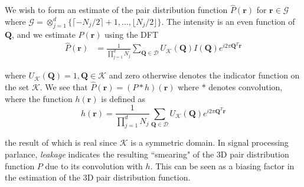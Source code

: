 We wish to form an estimate of the pair distribution function
$\widehat{P}(\mathbf{r})$ for $\mathbf{r} \in \mathcal{G}$ where $\mathcal{G} =
\otimes_{j=1}^d \{\lceil -N_j/2 \rceil + 1, \ldots, \lfloor N_j/2 \rfloor \}$. The
intensity is an even function of $\mathbf{Q}$, and we estimate $P(\mathbf{r})$ using
the DFT
\begin{align}
  \widehat{P}(\mathbf{r}) &= \frac{1}{\prod_{j=1}^d N_j} \sum_{\mathbf{Q}\in
  \mathcal{D}} U_{\mathcal{K}} (\mathbf{Q}) I(\mathbf{Q}) e^{i 2 \pi
  \mathbf{Q}^T\mathbf{r}} 
\end{align}

where $U_{\mathcal{K}}(\mathbf{Q}) = 1, \mathbf{Q} \in \mathcal{K}$ and zero
otherwise denotes the indicator function on the set $\mathcal{K}$. We see that
$\widehat{P}(\mathbf{r}) = (P*h)(\mathbf{r})$ where $*$ denotes convolution, where
the function $h(\mathbf{r})$ is defined as
\begin{equation}
 h(\mathbf{r}) = \frac{1}{\prod_{j=1}^d N_j} \sum_{\mathbf{Q}\in
  \mathcal{D}} U_{\mathcal{K}} (\mathbf{Q}) e^{i 2 \pi
  \mathbf{Q}^T\mathbf{r}}
\end{equation}

the result of which is real since $\mathcal{K}$ is a symmetric domain. In signal
processing parlance, \textit{leakage} indicates the resulting ``smearing" of the 3D
pair distribution function $P$ due to its convolution with $h$. This can be seen as a
biasing factor in the estimation of the 3D pair distribution function.

